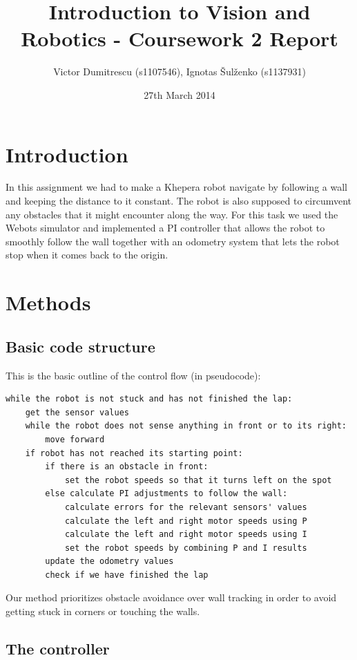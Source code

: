 \documentclass[10pt,a4paper]{article}
\title{Introduction to Vision and Robotics - Coursework 2 Report}
\author{Victor Dumitrescu (s1107546), Ignotas Šulženko (s1137931)}
\date{27th March 2014}
\begin{document}
\maketitle


\section{Introduction}\label{introduction}

In this assignment we had to make a Khepera robot navigate by following
a wall and keeping the distance to it constant. The robot is also
supposed to circumvent any obstacles that it might encounter along the
way. For this task we used the Webots simulator and implemented a PI
controller that allows the robot to smoothly follow the wall together
with an odometry system that lets the robot stop when it comes back to
the origin.

\section{Methods}\label{methods}

\subsection{Basic code structure}\label{basic-code-structure}

This is the basic outline of the control flow (in pseudocode):

\begin{verbatim}
while the robot is not stuck and has not finished the lap:
    get the sensor values
    while the robot does not sense anything in front or to its right:
        move forward
    if robot has not reached its starting point:
        if there is an obstacle in front:
            set the robot speeds so that it turns left on the spot
        else calculate PI adjustments to follow the wall:
            calculate errors for the relevant sensors' values
            calculate the left and right motor speeds using P
            calculate the left and right motor speeds using I
            set the robot speeds by combining P and I results
        update the odometry values
        check if we have finished the lap
\end{verbatim}

Our method prioritizes obstacle avoidance over wall tracking in order to
avoid getting stuck in corners or touching the walls.

\subsection{The controller}\label{the-controller}
\end{document}
